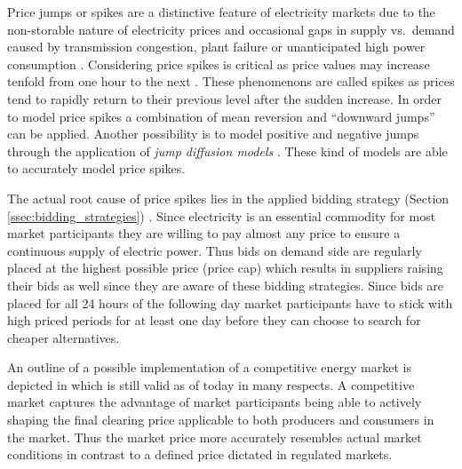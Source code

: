Price jumps or spikes are a distinctive feature of electricity markets due to the non-storable nature of electricity prices and occasional gaps in supply vs.~demand caused by transmission congestion, plant failure or unanticipated high power consumption \cite{weron2004modelingmarkets, weron2007modeling}. 
Considering price spikes is critical as price values may increase tenfold from one hour to the next \cite{huisman2007hourly}. 
These phenomenons are called spikes as prices tend to rapidly return to their previous level after the sudden increase. In order to model price spikes a combination of mean reversion and "`downward jumps"' can be applied. Another possibility is to model positive and negative jumps through the application of \textit{jump diffusion models} \cite{weron2004modeling}. These kind of models are able to accurately model price spikes. 

The actual root cause of price spikes lies in the applied bidding strategy (Section \ref{ssec:bidding_strategies}) \cite{weron2007modeling}. Since electricity is an essential commodity for most market participants they are willing to pay almost any price to ensure a continuous supply of electric power. Thus bids on demand side are regularly placed at the highest possible price (price cap) which results in suppliers raising their bids as well since they are aware of these bidding strategies. Since bids are placed for all 24 hours of the following day market participants have to stick with high priced periods for at least one day before they can choose to search for cheaper alternatives. 




An outline of a possible implementation of a competitive energy market is depicted in \cite{hogan1993competitive} which is still valid as of today in many respects. A competitive market captures the advantage of market participants being able to actively shaping the final clearing price applicable to both producers and consumers in the market. Thus the market price more accurately resembles actual market conditions in contrast to a defined price dictated in regulated markets. 




